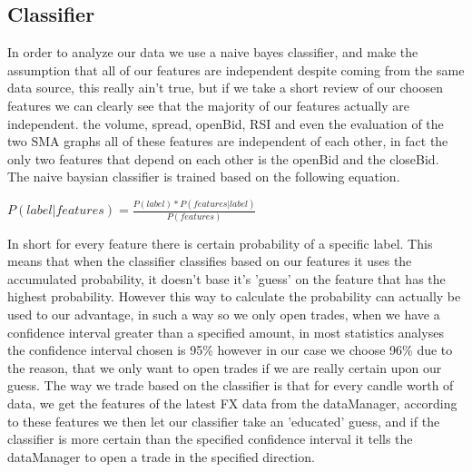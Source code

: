 \subsection{Classifier}
In order to analyze our data we use a naive bayes classifier, and make the assumption that all of our features are independent despite coming from the same data source, this really ain't true, but if we take a short review of our choosen features we can clearly see that the majority of our features actually are independent. the volume, spread, openBid, RSI and even the evaluation of the two SMA graphs all of these features are independent of each other, in fact the only two features that depend on each other is the openBid and the closeBid. The naive baysian classifier is trained based on the following equation.
\\
\begin{center}
$ P(label|features) = \frac{P(label)*P(features|label)}{P(features)}$
\end{center}

In short for every feature there is certain probability of a specific label. This means that when the classifier classifies based on our features it uses the accumulated probability, it doesn't base it's 'guess' on the feature that has the highest probability.
However this way to calculate the probability can actually be used to our advantage, in such a way so we only open trades, when we have a confidence interval greater than a specified amount, in most statistics analyses the confidence interval chosen is 95\% however in our case we choose 96\% due to the reason, that we only want to open trades if we are really certain upon our guess.
The way we trade based on the classifier is that for every candle worth of data, we get the features of the latest FX data from the dataManager, according to these features we then let our classifier take an 'educated' guess, and if the classifier is more certain than the specified confidence interval it tells the dataManager to open a trade in the specified direction.